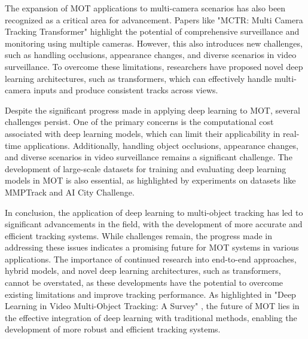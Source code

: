 \documentclass[conference]{IEEEtran}
\begin{document}
The expansion of MOT applications to multi-camera scenarios has also been recognized as a critical area for advancement. Papers like "MCTR: Multi Camera Tracking Transformer" \cite{MCTR: Multi Camera Tracking Transformer} highlight the potential of comprehensive surveillance and monitoring using multiple cameras. However, this also introduces new challenges, such as handling occlusions, appearance changes, and diverse scenarios in video surveillance. To overcome these limitations, researchers have proposed novel deep learning architectures, such as transformers, which can effectively handle multi-camera inputs and produce consistent tracks across views.

Despite the significant progress made in applying deep learning to MOT, several challenges persist. One of the primary concerns is the computational cost associated with deep learning models, which can limit their applicability in real-time applications. Additionally, handling object occlusions, appearance changes, and diverse scenarios in video surveillance remains a significant challenge. The development of large-scale datasets for training and evaluating deep learning models in MOT is also essential, as highlighted by experiments on datasets like MMPTrack and AI City Challenge.

In conclusion, the application of deep learning to multi-object tracking has led to significant advancements in the field, with the development of more accurate and efficient tracking systems. While challenges remain, the progress made in addressing these issues indicates a promising future for MOT systems in various applications. The importance of continued research into end-to-end approaches, hybrid models, and novel deep learning architectures, such as transformers, cannot be overstated, as these developments have the potential to overcome existing limitations and improve tracking performance. As highlighted in "Deep Learning in Video Multi-Object Tracking: A Survey" \cite{Deep Learning in Video Multi-Object Tracking: A Survey}, the future of MOT lies in the effective integration of deep learning with traditional methods, enabling the development of more robust and efficient tracking systems.
\end{document}

